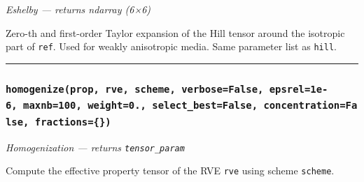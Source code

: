 \documentclass[
  a4paper,
  numbers=noendperiod,
  DIV=12]{scrreprt}
\begin{document}
\emph{Eshelby --- returns ndarray (6×6)}

Zero-th and first-order Taylor expansion of the Hill tensor around the
isotropic part of \texttt{ref}. Used for weakly anisotropic media. Same
parameter list as \texttt{hill}.

\begin{center}\rule{0.5\linewidth}{0.5pt}\end{center}

\subsubsection{\texorpdfstring{\texttt{homogenize(prop,\ rve,\ scheme,\ verbose=False,\ epsrel=1e-6,\ maxnb=100,\ weight=0.,\ select\_best=False,\ concentration=False,\ fractions=\{\})}}{homogenize(prop, rve, scheme, verbose=False, epsrel=1e-6, maxnb=100, weight=0., select\_best=False, concentration=False, fractions=\{\})}}\label{api-homogenize}

\emph{Homogenization --- returns \texttt{tensor\_param}}

Compute the effective property tensor of the RVE \texttt{rve} using
scheme \texttt{scheme}.
\end{document}
